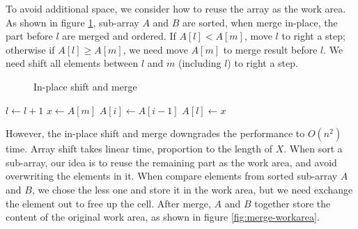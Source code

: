 \documentclass[b5paper]{article}
\begin{document}
To avoid additional space, we consider how to reuse the array as the work area. As shown in figure \ref{fig:merge-in-place-naive}, sub-array $A$ and $B$ are sorted, when merge in-place, the part before $l$ are merged and ordered. If $A[l] < A[m]$, move $l$ to right a step; otherwise if $A[l] \geq A[m]$, we need move $A[m]$ to merge result before $l$. We need shift all elements between $l$ and $m$ (including $l$) to right a step.

\begin{figure}[htbp]
 \centering
 \caption{In-place shift and merge}
 \label{fig:merge-in-place-naive}
\end{figure}

\begin{algorithmic}[1]
      \State $l \gets l + 1$
    \Else
      \State $x \gets A[m]$
       
        \State $A[i] \gets A[i-1]$
      \EndFor
      \State $A[l] \gets x$
    \EndIf
  \EndWhile
\EndProcedure
\end{algorithmic}

However, the in-place shift and merge downgrades the performance to $O(n^2)$ time. Array shift takes linear time, proportion to the length of $X$. When sort a sub-array, our idea is to reuse the remaining part as the work area, and avoid overwriting the elements in it. When compare elements from sorted sub-array $A$ and $B$, we chose the less one and store it in the work area, but we need exchange the element out to free up the cell. After merge, $A$ and $B$ together store the content of the original work area, as shown in figure \ref{fig:merge-workarea}.
\end{document}
